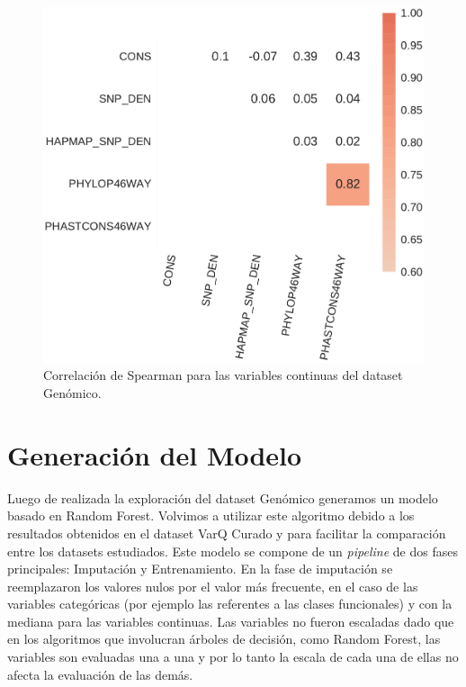\begin{figure}[H]
    \centering
    \includegraphics[scale=0.7]{documents/latex/figures/3/genomic/genomic_corr.pdf}
    \caption{Correlación de Spearman para las variables continuas del dataset Genómico.}
    \label{fig:corrplot_genomic}
\end{figure}


\section{Generación del Modelo}

Luego de realizada la exploración del dataset Genómico generamos un modelo basado en Random Forest. Volvimos a utilizar este algoritmo debido a los resultados obtenidos en el dataset VarQ Curado y para facilitar la comparación entre los datasets estudiados. Este modelo se compone de un \textit{pipeline} de dos fases principales: Imputación y Entrenamiento. En la fase de imputación se reemplazaron los valores nulos por el valor más frecuente, en el caso de las variables categóricas (por ejemplo las referentes a las clases funcionales) y con la mediana para las variables continuas. Las variables no fueron escaladas dado que en los algoritmos que involucran árboles de decisión, como Random Forest, las variables son evaluadas una a una y por lo tanto la escala de cada una de ellas no afecta la evaluación de las demás.

